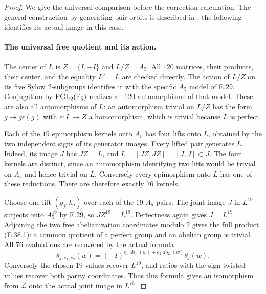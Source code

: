 \begin{proof}
We give the universal comparison before the correction
calculation.  The general construction by generating-pair
orbits is described in \cite[\S2.1, Lemma 2.1]{DE_Guillot2015};
the following identifies its actual image in this case.

\paragraph{The universal free quotient and its action.}
The center of $L$ is $Z=\{I,-I\}$ and $L/Z=A_5$.
All $120$ matrices, their products, their center, and the
equality $L'=L$ are checked directly.  The action of $L/Z$
on its five Sylow $2$-subgroups identifies it with the
specific $A_5$ model of E.29.  Conjugation by
$\operatorname{PGL}_2(\mathbb F_5)$ realizes all $120$
automorphisms of that model.  These are also all
automorphisms of $L$: an automorphism trivial on $L/Z$
has the form $g\mapsto g\epsilon(g)$ with
$\epsilon:L\to Z$ a homomorphism, which is trivial
because $L$ is perfect.

Each of the $19$ epimorphism kernels onto $A_5$ has
four lifts onto $L$, obtained by the two independent
signs of its generator images.  Every lifted pair
generates $L$.  Indeed, its image $J$ has $JZ=L$,
and $L=[JZ,JZ]=[J,J]\subset J$.
The four kernels are distinct, since an automorphism
identifying two lifts would be trivial on $A_5$ and
hence trivial on $L$.  Conversely every epimorphism
onto $L$ has one of these reductions.  There are
therefore exactly $76$ kernels.

Choose one lift $(g_j,h_j)$ over each of the $19$
$A_5$ pairs.  The joint image $J$ in $L^{19}$
surjects onto $A_5^{19}$ by E.29, so
$JZ^{19}=L^{19}$.  Perfectness again gives
$J=L^{19}$.  Adjoining the two free abelianization
coordinates modulo $2$ gives the full product
\textup{(E.38.1)}: a common quotient of a perfect
group and an abelian group is trivial.  All $76$
evaluations are recovered by the actual formula
\[
 \theta_{j,e_1,e_2}(w)
   =(-I)^{e_1\operatorname{ab}_1(w)+
               e_2\operatorname{ab}_2(w)}\theta_j(w).
 \tag{E.38.3}
\]
Conversely the chosen $19$ values recover $L^{19}$,
and ratios with the sign-twisted values recover
both parity coordinates.  Thus this formula gives
an isomorphism from $\mathcal L$ onto the actual
joint image in $L^{76}$.


\end{proof}
